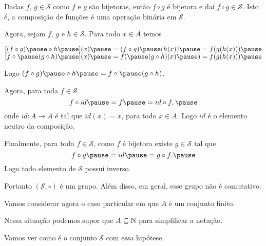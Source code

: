 \documentclass{beamer}
\begin{document}
    \begin{frame}
        Dadas $f$, $g \in \mathcal{S}$ \pause como $f$ e $g$ são bijetoras, \pause então $f \circ g$ é bijetora \pause e daí $f \circ g \in \mathcal{S}$. \pause Isto é, \pause a composição de funções \pause é uma operação binária em $\mathcal{S}$.

        \vspace{.3cm}

        Agora, sejam $f$, $g$ e $h \in \mathcal{S}$. \pause Para todo $x \in A$ temos\pause
        \begin{center}
            $[(f\circ g) \pause \circ h \pause](x) \pause = (f \circ g) \pause(h(x)) \pause = f(g(h(x))) \pause$\\
            $[f\circ \pause(g\circ h) \pause](x) \pause = f( \pause(g\circ h)(x) \pause) = f(g(h(x))) \pause$
        \end{center}

        Logo $(f\circ g) \pause \circ h  \pause = f\circ \pause (g\circ h)$. \pause

        \vspace{.3cm}

        Agora, para toda $f \in \mathcal{S}$\pause
        \[
            f\circ id  \pause = f  \pause = id\circ f, \pause
        \]
        onde $id : A \to A$ \pause é tal que $id(x) = x$, \pause para todo $x \in A$. \pause Logo $id$ é o elemento neutro da composição.\pause

    \end{frame}

    \begin{frame}

        Finalmente, \pause para toda $f \in \mathcal{S}$, \pause como $f$ é bijetora \pause existe $g \in \mathcal{S}$ \pause tal que \pause
        \[
            f\circ g \pause = id \pause = g \circ f. \pause
        \]
        Logo todo elemento de $\mathcal{S}$ \pause possui inverso. \pause

        \vspace{.3cm}

        Portanto $(\mathcal{S}, \circ)$ \pause é um grupo. \pause Além disso, em geral, esse grupo não é comutativo. \pause

        \vspace{.3cm}

        Vamos considerar agora o caso particular \pause em que $A$ é um conjunto finito. \pause

        \vspace{.3cm}

        Nessa situação podemos supor que $A \subseteq \mathbb{N}$ \pause para simplificar a notação. \pause

        \vspace{.3cm}

        Vamos ver como é o conjunto $\mathcal{S}$ com essa hip\'otese. \pause
    \end{frame}
\end{document}
